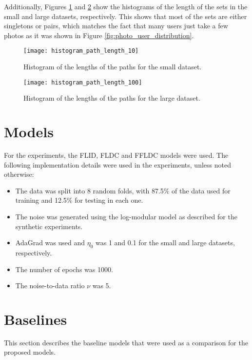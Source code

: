 Additionally, Figures \ref{fig:histogram_path_length_10} and \ref{fig:histogram_path_length_100} show the histograms of the length of the sets in the small and large datasets, respectively. This shows that most of the sets are either singletons or pairs, which matches the fact that many users just take a few photos as it was shown in Figure \ref{fig:photo_user_distribution}.

\begin{figure}
  \centering
  \texttt{[image: histogram\_path\_length\_10]}
  \caption{Histogram of the lengths of the paths for the small dataset.}
  \label{fig:histogram_path_length_10}
\end{figure}

\begin{figure}
  \centering
  \texttt{[image: histogram\_path\_length\_100]}
  \caption{Histogram of the lengths of the paths for the large dataset.}
  \label{fig:histogram_path_length_100}
\end{figure}

\section{Models}

For the experiments, the FLID, FLDC and FFLDC models were used. The following implementation details were used in the experiments, unless noted otherwise:

\begin{itemize}
  \item The data was split into 8 random folds, with 87.5\% of the data used for training and 12.5\% for testing in each one.
  \item The noise was generated using the log-modular model as described for the synthetic experiments.
  \item AdaGrad was used and $\eta_{0}$ was 1 and 0.1 for the small and large datasets, respectively.
  \item The number of epochs was 1000.
  \item The noise-to-data ratio $\nu$ was 5.
\end{itemize}

\section{Baselines}
\label{sec:baselines}

This section describes the baseline models that were used as a comparison for the proposed models.

